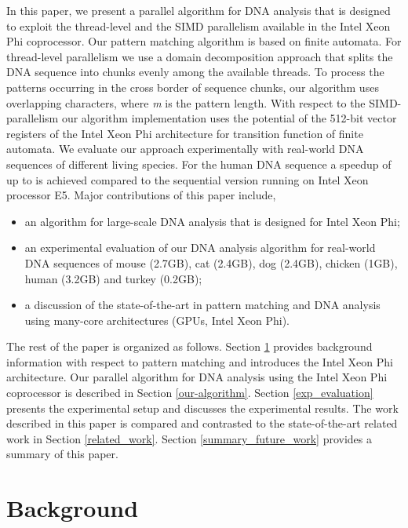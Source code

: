 \documentclass[conference]{IEEEtran}
\begin{document}
In this paper, we present a parallel algorithm for DNA analysis that is designed to exploit the thread-level and the SIMD parallelism available in the Intel Xeon Phi coprocessor. Our pattern matching algorithm is based on finite automata. For thread-level parallelism we use a domain decomposition approach that splits the DNA sequence into chunks evenly among the available threads. To process the patterns occurring in the cross border of sequence chunks, our algorithm uses  overlapping characters, where \emph{m} is the pattern length. With respect to the SIMD-parallelism our algorithm implementation uses the potential of the 512-bit vector registers of the Intel Xeon Phi architecture for transition function of finite automata. We evaluate our approach experimentally with real-world DNA sequences of different living species. For the human DNA sequence a speedup of up to  is achieved compared to the sequential version running on Intel Xeon processor E5. Major contributions of this paper include,
\begin{itemize}
	\item an algorithm for large-scale DNA analysis that is designed for Intel Xeon Phi;
	\item an experimental evaluation of our DNA analysis algorithm for real-world DNA sequences of mouse (2.7GB), cat (2.4GB), dog (2.4GB), chicken (1GB), human (3.2GB) and turkey (0.2GB);
	\item a discussion of the state-of-the-art in pattern matching and DNA analysis using many-core architectures (GPUs, Intel Xeon Phi).
\end{itemize}




The rest of the paper is organized as follows. Section \ref{background} provides background information with respect to pattern matching and introduces the Intel Xeon Phi architecture. Our parallel algorithm for DNA analysis using the Intel Xeon Phi coprocessor is described in Section \ref{our-algorithm}. Section \ref{exp_evaluation} presents the experimental setup and discusses the experimental results. The work described in this paper is compared and contrasted to the state-of-the-art related work in Section \ref{related_work}. Section \ref{summary_future_work} provides a summary of this paper. 



\section{Background} 
\label{background}
\end{document}
